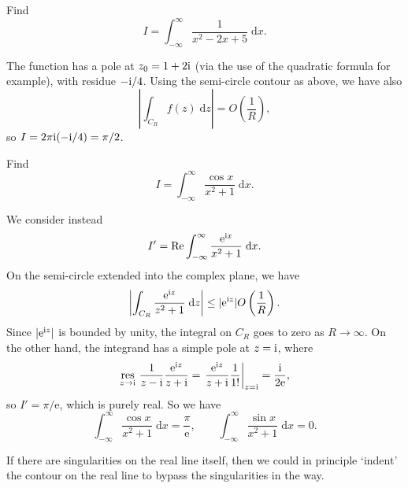 \documentclass[letter-paper]{tufte-book}
\newenvironment{example}[1][Example]{\begin{trivlist}
\item[\hskip \labelsep {\bfseries #1}]}{\end{trivlist}}
\newcommand{\ex}{\mathrm{e}}
\newcommand{\zi}{{\rm i}}
\begin{document}
\begin{example}
  Find
  \begin{equation*}
    I = \int_{-\infty}^\infty \frac{1}{x^2 - 2x + 5}\; \mathrm{d}x.
  \end{equation*}
  
  The function has a pole at $z_0 = 1+2\zi$ (via the use of the quadratic
  formula for example), with residue $-\zi/4$. Using the semi-circle contour as
  above, we have also
  \begin{equation*}
    \left|\int_{C_R} f(z)\; \mathrm{d}z\right| = O\left(\frac{1}{R}\right),
  \end{equation*}
  so $I = 2\pi\zi(-\zi /4) = \pi/2$.
\end{example}

\begin{example}
  Find
  \begin{equation*}
    I = \int_{-\infty}^\infty \frac{\cos x}{x^2 +1}\; \mathrm{d}x.
  \end{equation*}
  
  We consider instead
  \begin{equation*}
    I' = \mbox{Re}\int_{-\infty}^\infty \frac{\ex^{\zi x}}{x^2 +1}\; \mathrm{d}x.
  \end{equation*}
  On the semi-circle extended into the complex plane, we have
  \begin{equation*}
    \left|\int_{C_R} \frac{\ex^{\zi z}}{z^2+1}\; \mathrm{d}z\right| \leq |\ex^{\zi z}| O\left(\frac{1}{R}\right).
  \end{equation*}
  Since $|\ex^{\zi z}|$ is bounded by unity, the integral on $C_R$ goes to zero
  as $R\to\infty$. On the other hand, the integrand has a simple pole at
  $z=\zi$, where
  \begin{equation*}
    \underset{z \to \zi}{\mbox{res}}\ \frac{1}{z-\zi}\frac{\ex^{\zi z}}{z+\zi} = \left.\frac{\ex^{\zi z}}{z+\zi} \frac{1}{1!}\right|_{z=\zi} = \frac{\zi}{2\ex},
  \end{equation*}
  so $I' = \pi/\ex$, which is purely real. So we have
  \begin{equation*}
    \int_{-\infty}^\infty \frac{\cos x}{x^2 +1}\; \mathrm{d}x = \frac{\pi}{\ex}, \qquad \int_{-\infty}^\infty \frac{\sin x}{x^2 +1}\; \mathrm{d}x = 0.
  \end{equation*}
\end{example}

If there are singularities on the real line itself, then we could in principle
`indent' the contour on the real line to bypass the singularities in the way.
\end{document}
